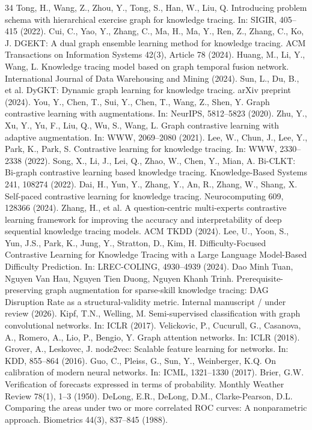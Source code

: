 \documentclass[11pt,a4paper]{article}
\begin{document}
\begin{thebibliography}{34}
 Tong, H., Wang, Z., Zhou, Y., Tong, S., Han, W., Liu, Q. Introducing problem schema with hierarchical exercise graph for knowledge tracing. In: SIGIR, 405--415 (2022).
 Cui, C., Yao, Y., Zhang, C., Ma, H., Ma, Y., Ren, Z., Zhang, C., Ko, J. DGEKT: A dual graph ensemble learning method for knowledge tracing. ACM Transactions on Information Systems 42(3), Article 78 (2024).
 Huang, M., Li, Y., Wang, L. Knowledge tracing model based on graph temporal fusion network. International Journal of Data Warehousing and Mining (2024).
 Sun, L., Du, B., et al. DyGKT: Dynamic graph learning for knowledge tracing. arXiv preprint (2024).
 You, Y., Chen, T., Sui, Y., Chen, T., Wang, Z., Shen, Y. Graph contrastive learning with augmentations. In: NeurIPS, 5812--5823 (2020).
 Zhu, Y., Xu, Y., Yu, F., Liu, Q., Wu, S., Wang, L. Graph contrastive learning with adaptive augmentation. In: WWW, 2069--2080 (2021).
 Lee, W., Chun, J., Lee, Y., Park, K., Park, S. Contrastive learning for knowledge tracing. In: WWW, 2330--2338 (2022).
 Song, X., Li, J., Lei, Q., Zhao, W., Chen, Y., Mian, A. Bi-CLKT: Bi-graph contrastive learning based knowledge tracing. Knowledge-Based Systems 241, 108274 (2022).
 Dai, H., Yun, Y., Zhang, Y., An, R., Zhang, W., Shang, X. Self-paced contrastive learning for knowledge tracing. Neurocomputing 609, 128366 (2024).
 Zhang, H., et al. A question-centric multi-experts contrastive learning framework for improving the accuracy and interpretability of deep sequential knowledge tracing models. ACM TKDD (2024).
 Lee, U., Yoon, S., Yun, J.S., Park, K., Jung, Y., Stratton, D., Kim, H. Difficulty-Focused Contrastive Learning for Knowledge Tracing with a Large Language Model-Based Difficulty Prediction. In: LREC-COLING, 4930--4939 (2024).
 Dao Minh Tuan, Nguyen Van Hau, Nguyen Tien Duong, Nguyen Khanh Trinh. Prerequisite-preserving graph augmentation for sparse-skill knowledge tracing: DAG Disruption Rate as a structural-validity metric. Internal manuscript / under review (2026).
 Kipf, T.N., Welling, M. Semi-supervised classification with graph convolutional networks. In: ICLR (2017).
 Velickovic, P., Cucurull, G., Casanova, A., Romero, A., Lio, P., Bengio, Y. Graph attention networks. In: ICLR (2018).
 Grover, A., Leskovec, J. node2vec: Scalable feature learning for networks. In: KDD, 855--864 (2016).
 Guo, C., Pleiss, G., Sun, Y., Weinberger, K.Q. On calibration of modern neural networks. In: ICML, 1321--1330 (2017).
 Brier, G.W. Verification of forecasts expressed in terms of probability. Monthly Weather Review 78(1), 1--3 (1950).
 DeLong, E.R., DeLong, D.M., Clarke-Pearson, D.L. Comparing the areas under two or more correlated ROC curves: A nonparametric approach. Biometrics 44(3), 837--845 (1988).
\end{thebibliography}
\end{document}
